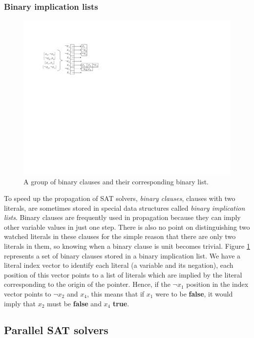 \documentclass[12pt]{diicc}
\begin{document}
\subsubsection{Binary implication lists}

\begin{figure}[h!]
	\centering
		\includegraphics[scale=1]{binary_list}
	\caption{A group of binary clauses and their corresponding binary list.}
	\label{fig:binary list}
\end{figure}

To speed up the propagation of SAT solvers, \textit{binary clauses}, clauses with two literals, are sometimes stored in special data structures called \textit{binary implication lists}. Binary clauses are frequently used in propagation because they can imply other variable values in just one step. There is also no point on distinguishing two watched literals in these clauses for the simple reason that there are only two literals in them, so knowing when a binary clause is unit becomes trivial. Figure \ref{fig:binary list} represents a set of binary clauses stored in a binary implication list. We have a literal index vector to identify each literal (a variable and its negation), each position of this vector points to a list of literals which are implied by the literal corresponding to the origin of the pointer. Hence, if the $\neg x_{1}$ position in the index vector points to $\neg x_{2}$ and $x_{4}$, this means that if $x_{1}$ were to be \textbf{false}, it would imply that $x_{2}$ must be \textbf{false} and $x_{4}$ \textbf{true}.

\subsection{Parallel SAT solvers}
\end{document}
